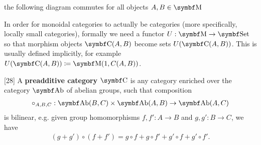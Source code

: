 \begin{definition}
\begin{defenum}
    \item the following diagram commutes for all objects \( A, B \in \Bold M \)

    \begin{Center}
    \end{Center}
  \end{defenum}

  In order for monoidal categories to actually be categories (more specifically, locally small categories), formally we need a functor \( U: \Bold{M} \to \Bold{Set} \) so that morphism objects \( \Bold C(A, B) \) become sets \( U(\Bold C(A, B)) \). This is usually defined implicitly, for example \( U(\Bold C(A, B)) \coloneqq \Bold{M}(1, C(A, B)) \).
\end{definition}

\begin{definition}\label{def:preadditive_category}\cite{MacLane1994}[28]
  A \textbf{preadditive category \( \Bold C \)} is any category enriched over the category \( \Bold{Ab} \) of abelian groups, such that composition
  \begin{align*}
    \circ_{A,B,C}: \Bold{Ab}(B, C) \times \Bold{Ab}(A, B) \to \Bold{Ab}(A, C)
  \end{align*}
  is bilinear, e.g. given group homomorphisms \( f, f': A \to B \) and \( g, g': B \to C \), we have
  \begin{align*}
    (g + g') \circ (f + f') = g \circ f + g \circ f' + g' \circ f + g' \circ f'.
  \end{align*}
\end{definition}

